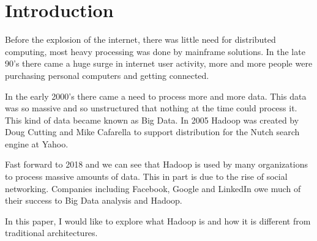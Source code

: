 \section{Introduction}
  
Before the explosion of the internet, there was little need for distributed computing, most heavy processing was done by mainframe solutions. In the late 90's there came a huge surge in internet user activity, more and more people were purchasing personal computers and getting connected.
   
In the early 2000's there came a need to process more and more data. This data was so massive and so unstructured that nothing at the time could process it. This kind of data became known as Big Data. In 2005 Hadoop was created by Doug Cutting and Mike Cafarella to support distribution for the Nutch search engine at Yahoo\cite{nutch}.

Fast forward to 2018 and we can see that Hadoop is used by many organizations to process massive amounts of data. This in part is due to the rise of social networking. Companies including Facebook, Google and LinkedIn owe much of their success to Big Data analysis and Hadoop.

In this paper, I would like to explore what Hadoop is and how it is different from traditional architectures.